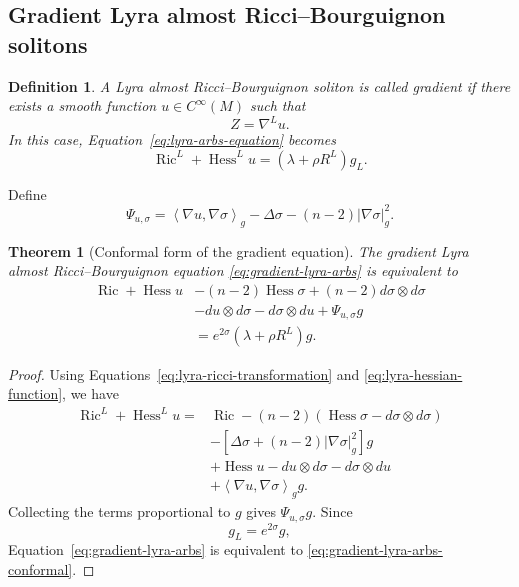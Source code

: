 \documentclass[a4paper,11pt]{article}
\theoremstyle{plain}
\newtheorem{theorem}{Theorem}[section]
\newtheorem{definition}{Definition}[section]
\numberwithin{equation}{section}
\begin{document}
\subsection{Gradient Lyra almost Ricci--Bourguignon solitons}
\label{subsec:gradient-lyra-arbs}

\begin{definition}
	\label{def:gradient-lyra-arbs}
	A Lyra almost Ricci--Bourguignon soliton is called
	\emph{gradient} if there exists a smooth function
	\(u\in C^{\infty}(M)\) such that
	\[
	Z=\nabla^{L}u.
	\]
	In this case, Equation~\eqref{eq:lyra-arbs-equation} becomes
	\begin{equation}
		\operatorname{Ric}^{L}
		+
		\operatorname{Hess}^{L}u
		=
		\left(
		\lambda+\rho R^{L}
		\right)g_{L}.
		\label{eq:gradient-lyra-arbs}
	\end{equation}
\end{definition}

Define
\begin{equation}
	\Psi_{u,\sigma}
	=
	\left\langle
	\nabla u,\nabla\sigma
	\right\rangle_{g}
	-
	\Delta\sigma
	-
	(n-2)
	\lvert\nabla\sigma\rvert_{g}^{2}.
	\label{eq:psi-u-sigma}
\end{equation}

\begin{theorem}[Conformal form of the gradient equation]
	\label{thm:gradient-lyra-arbs-conformal-form}
	The gradient Lyra almost Ricci--Bourguignon equation
	\eqref{eq:gradient-lyra-arbs} is equivalent to
	\begin{align}
		\operatorname{Ric}
		+
		\operatorname{Hess}u
		&-
		(n-2)\operatorname{Hess}\sigma
		+
		(n-2)d\sigma\otimes d\sigma
		\nonumber\\
		&-
		du\otimes d\sigma
		-
		d\sigma\otimes du
		+
		\Psi_{u,\sigma}g
		\nonumber\\
		&=
		e^{2\sigma}
		\left(
		\lambda+\rho R^{L}
		\right)g.
		\label{eq:gradient-lyra-arbs-conformal}
	\end{align}
\end{theorem}

\begin{proof}
	Using Equations~\eqref{eq:lyra-ricci-transformation} and
	\eqref{eq:lyra-hessian-function}, we have
	\begin{align*}
		\operatorname{Ric}^{L}
		+
		\operatorname{Hess}^{L}u
		={}&
		\operatorname{Ric}
		-
		(n-2)
		\left(
		\operatorname{Hess}\sigma
		-
		d\sigma\otimes d\sigma
		\right)
		\\
		&-
		\left[
		\Delta\sigma
		+
		(n-2)
		\lvert\nabla\sigma\rvert_{g}^{2}
		\right]g
		\\
		&+
		\operatorname{Hess}u
		-
		du\otimes d\sigma
		-
		d\sigma\otimes du
		\\
		&+
		\left\langle
		\nabla u,\nabla\sigma
		\right\rangle_{g}g.
	\end{align*}
	Collecting the terms proportional to \(g\) gives
	\(\Psi_{u,\sigma}g\). Since
	\[
	g_{L}=e^{2\sigma}g,
	\]
	Equation~\eqref{eq:gradient-lyra-arbs} is equivalent to
	\eqref{eq:gradient-lyra-arbs-conformal}.
\end{proof}
\end{document}
